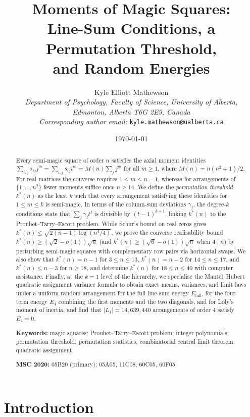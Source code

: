 \documentclass[11pt,a4paper]{article}
\title{\textbf{Moments of Magic Squares:\\ Line-Sum Conditions, a Permutation Threshold,\\ and Random Energies}}
\author{Kyle Elliott Mathewson\\
\textit{Department of Psychology, Faculty of Science, University of Alberta,}\\
\textit{Edmonton, Alberta T6G 2E9, Canada}\\
\textit{Corresponding author email:} \texttt{kyle.mathewson@ualberta.ca}}
\date{\today}
\theoremstyle{plain}
\theoremstyle{definition}
\theoremstyle{remark}
\newcommand{\Efull}{E_{\mathrm{full}}}
\newcommand{\Efour}{E_4}
\begin{document}
\maketitle

\begin{abstract}
Every semi-magic square of order $n$ satisfies the axial moment identities $\sum_{i,j}s_{ij}j^m=\sum_{i,j}s_{ij}i^m=M(n)\sum_jj^m$ for all $m\ge1$, where $M(n)=n(n^2+1)/2$. For real matrices the converse requires $1\le m\le n-1$, whereas for arrangements of $\{1,\dots,n^2\}$ fewer moments suffice once $n\ge14$. We define the \emph{permutation threshold} $k^*(n)$ as the least $k$ such that every arrangement satisfying these identities for $1\le m\le k$ is semi-magic. In terms of the column-sum deviations $\gamma_j$, the degree-$k$ conditions state that $\sum_j\gamma_jt^j$ is divisible by $(t-1)^{k+1}$, linking $k^*(n)$ to the Prouhet--Tarry--Escott problem. While Schur's bound on real zeros gives $k^*(n)\le\sqrt{2(n-1)\log(n^4/4)}$, we prove the converse realisability bound $k^*(n)\ge(\sqrt2-o(1))\sqrt n$ (and $k^*(n)\ge(\sqrt6-o(1))\sqrt n$ when $4\mid n$) by perturbing semi-magic squares with complementary row pairs via horizontal swaps. We also show that $k^*(n)=n-1$ for $3\le n\le13$, $k^*(n)=n-2$ for $14\le n\le17$, and $k^*(n)\le n-3$ for $n\ge18$, and determine $k^*(n)$ for $18\le n\le40$ with computer assistance. Finally, at the $k=1$ level of the hierarchy, we specialise the Mantel--Hubert quadratic assignment variance formula to obtain exact means, variances, and limit laws under a uniform random arrangement for the full line-sum energy $\Efull$, for the four-term energy $\Efour$ combining the first moments and the two diagonals, and for Loly's moment of inertia, and find that $|L_4|=14{,}639{,}440$ arrangements of order $4$ satisfy $\Efour=0$.

\medskip
\noindent\textbf{Keywords:} magic squares; Prouhet--Tarry--Escott problem; integer polynomials; permutation threshold; permutation statistics; combinatorial central limit theorem; quadratic assignment

\noindent\textbf{MSC 2020:} 05B20 (primary); 05A05, 11C08, 60C05, 60F05
\end{abstract}


\section{Introduction}
\label{sec:introduction}
\end{document}
